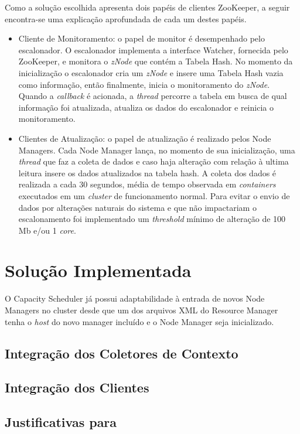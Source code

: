 Como a solução escolhida apresenta dois papéis de clientes ZooKeeper, a seguir encontra-se uma explicação aprofundada de cada um destes papéis.

\begin{itemize}
	\item Cliente de Monitoramento: o papel de monitor é desempenhado pelo escalonador. O escalonador implementa a interface Watcher, fornecida pelo ZooKeeper, e monitora o \textit{zNode} que contém a Tabela Hash. No momento da inicialização o escalonador cria um \textit{zNode} e insere uma Tabela Hash vazia como informação, então finalmente, inicia o monitoramento do \textit{zNode}. Quando a \textit{callback} é acionada, a \textit{thread} percorre a tabela em busca de qual informação foi atualizada, atualiza os dados do escalonador e reinicia o monitoramento.
	
	\item Clientes de Atualização: o papel de atualização é realizado pelos Node Managers. Cada Node Manager lança, no momento de sua inicialização, uma \textit{thread} que faz a coleta de dados e caso haja alteração com relação à ultima leitura insere os dados atualizados na tabela hash. A coleta dos dados é realizada a cada 30 segundos, média de tempo observada em \textit{containers} executados em um \textit{cluster} de funcionamento normal. Para evitar o envio de dados por alterações naturais do sistema e que não impactariam o escalonamento foi implementado um \textit{threshold} mínimo de alteração de 100 Mb e/ou 1 \textit{core}.
	
\end{itemize}

\section{Solução Implementada}
\label{sec:solucao}
O Capacity Scheduler já possui adaptabilidade à entrada de novos Node Managers no cluster desde que um dos arquivos XML do Resource Manager tenha o \textit{host} do novo manager incluído e o Node Manager seja inicializado.

\subsection{Integração dos Coletores de Contexto}

\subsection{Integração dos Clientes}

\subsection{Justificativas para }